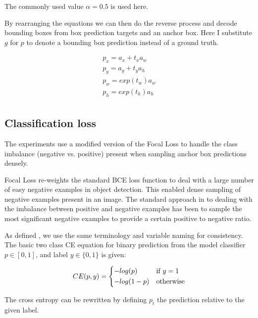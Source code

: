 The commonly used value $\alpha = 0.5$ is used here.

By rearranging the equations we can then do the reverse process and decode bounding boxes from box prediction targets and an anchor box. Here I substitute $ g $ for $ p $ to denote a bounding box prediction instead of a ground truth.

\begin{equation}
\begin{split}
p_x = a_x + t_x  a_w\\
p_y = a_y + t_y  a_h\\
p_w = exp(t_w) a_w \\
p_h = exp(t_h) a_h\\
\end{split}
\label{eq:decoding_rcnn}
\end{equation}

\subsection {Classification loss}
\label{sec:loss}

The experiments use a modified version of the Focal Loss \cite{Lin2017} to handle the class imbalance (negative vs. positive) present when sampling anchor box predictions densely.

Focal Loss \cite{Lin2017} re-weights the standard \gls{BCE} loss function to deal with a large number of easy negative examples in object detection. This enabled dense sampling of negative examples present in an image. The standard approach in to dealing with the imbalance between positive and negative examples has been to sample the most significant negative examples to provide a certain positive to negative ratio.


As defined \cite{Lin2017}, we use the same terminology and variable naming for consistency. The basic two class \gls{CE} equation for binary prediction from the model classifier $p \in \left[0, 1\right]$, and label $y \in \{0, 1\}$  is given:

\begin{equation}
CE(p, y) = 
  \begin{cases*}
  -log(p) & if $y = 1$\\
  -log(1-p) & otherwise\\
  \end{cases*}
\label{eq:cross_entropy}
\end{equation}


The cross entropy can be rewritten by defining $p_t$ the prediction relative to the given label.

